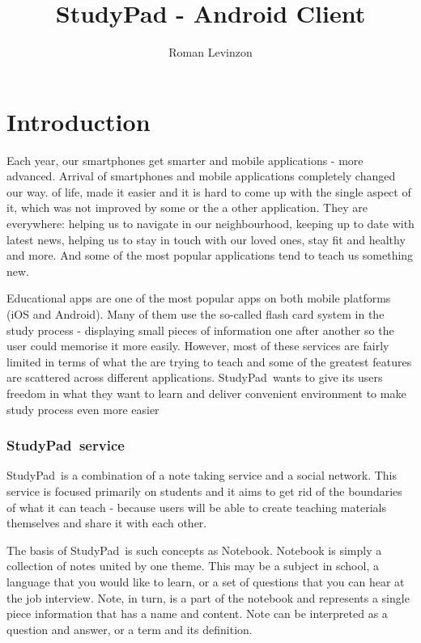\documentclass[thesis=B,english]{FITthesis}[2012/10/20]
\title{StudyPad - Android Client}
\author{Roman Levinzon} %
\newcommand{\appname}{StudyPad}
\begin{document}

\chapter{Introduction}

Each year, our smartphones get smarter and mobile applications - more advanced. Arrival of smartphones and mobile applications completely changed our way. of life, made it easier and it is hard to come up with the single aspect of it, which was not improved by some or the a other application. They are everywhere: helping us to navigate in our neighbourhood, keeping up to date with latest news, helping us to stay in touch with our loved ones, stay  fit and healthy and more. And some of the most popular applications tend to teach us something new.	

Educational apps are one of the most popular apps on both mobile platforms (iOS and Android). Many of them use the so-called flash card system in the study process - displaying small pieces of information one after another so the user could memorise it more easily. However, most of these services are fairly limited in terms of what the are trying to teach and some of the greatest  features are scattered across different applications. \appname\ wants to give its users freedom in what they want to learn and deliver convenient environment to make study process even more easier

\subsection{\appname\ service}
\appname\ is a combination of a note taking service and a social network. This service is focused primarily on students and it aims to get rid of the boundaries of what it can teach - because users will be able to create teaching materials themselves and share it with each other.

The basis of \appname\ is such concepts as Notebook. Notebook is simply a collection of notes united by one theme. This may be a subject in school, a language that you would like to learn, or a set of questions that you can hear at the job interview. Note, in turn, is a part of the notebook and represents a single piece information that has a name and content. Note can be interpreted as a question and answer, or a term and its definition.
\end{document}
